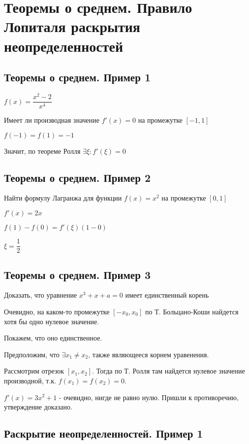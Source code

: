 \section{Теоремы о среднем. Правило Лопиталя раскрытия неопределенностей}

\subsection{Теоремы о среднем. Пример 1}

$ f(x) = \dfrac{x^{2} - 2}{x^{4}} $

Имеет ли производная значение $ f'(x) = 0 $ на промежутке $ [-1,1] $

$ f(-1) = f(1) = -1 $

Значит, по теореме Ролля $ \exists \xi : f'(\xi) = 0 $

\subsection{Теоремы о среднем. Пример 2}

Найти формулу Лагранжа для функции $ f(x) = x^{2} $ на промежутке $ [0,1] $

$ f'(x) = 2x $

$ f(1) - f(0) = f'(\xi)(1-0)$

$ \xi = \dfrac{1}{2} $

\subsection{Теоремы о среднем. Пример 3}

Доказать, что уравнение $ x^{3} + x + a = 0 $ имеет единственный корень

Очевидно, на каком-то промежутке $ [-x_0, x_0] $ по Т. Больцано-Коши найдется хотя бы одно нулевое значение.

Покажем, что оно единственное.

Предположим, что $ \exists x_1 \ne x_2 $, также являющееся корнем уравенения.

Рассмотрим отрезок $ [x_1, x_2] $. Тогда по Т. Ролля там найдется нулевое значение производной,
т.к. $ f(x_1) = f(x_2) = 0 $.

$ f'(x) = 3x^{2}+1 $ - очевидно, нигде не равно нулю. Пришли к противоречию, утверждение доказано.

\subsection{Раскрытие неопределенностей. Пример 1}

